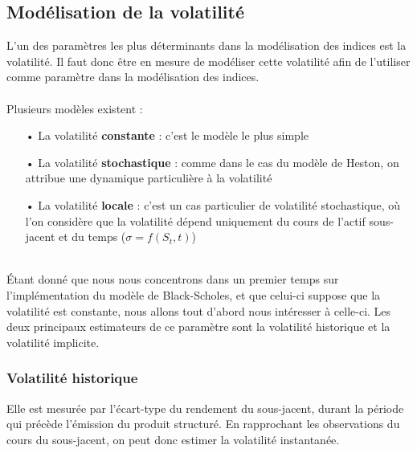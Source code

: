\documentclass[french,12pt,a4paper]{article}
\begin{document}
\subsection{Modélisation de la volatilité}
L'un des paramètres les plus déterminants dans la modélisation des indices est la volatilité. Il faut donc être en mesure de modéliser cette volatilité afin de l'utiliser comme paramètre dans la modélisation des indices.\\ \\
Plusieurs modèles existent :
\begin{itemize}
\item[•] La volatilité \textbf{constante} : c'est le modèle le plus simple
\item[•] La volatilité \textbf{stochastique} : comme dans le cas du modèle de Heston, on attribue une dynamique particulière à la volatilité
\item[•] La volatilité \textbf{locale} : c'est un cas particulier de volatilité stochastique, où l'on considère que la volatilité dépend uniquement du cours de l'actif sous-jacent et du temps ($\sigma = f(S_{t},t)$)
\end{itemize}
\\
Étant donné que nous nous concentrons dans un premier temps sur l'implémentation du modèle de Black-Scholes, et que celui-ci suppose que la volatilité est constante, nous allons tout d'abord nous intéresser à celle-ci.  Les deux principaux estimateurs de ce paramètre sont la volatilité historique et la volatilité implicite.

\subsubsection{Volatilité historique}
Elle est mesurée par l'écart-type du rendement du sous-jacent, durant la période qui précède l'émission du produit structuré. En rapprochant les observations du cours du sous-jacent, on peut donc estimer la volatilité instantanée.\\
\end{document}
